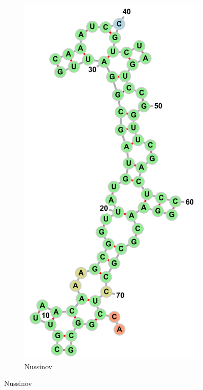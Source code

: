 \documentclass[10pt]{article}
\begin{document}
\begin{figure}[p]
    \begin{subfigure}[b]{0.2\linewidth}
        \includegraphics[width=\linewidth]{./img/PDB_00313_nussinov.png}
        \caption{Nussinov}

\end{subfigure}
\end{figure}
\end{document}
